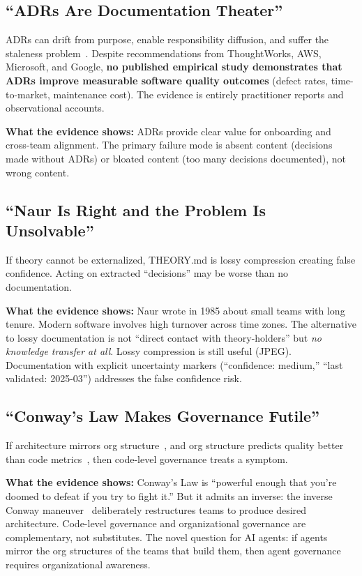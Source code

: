 \documentclass[11pt, a4paper, copyright]{googledeepmind}
\begin{document}
\subsection{``ADRs Are Documentation Theater''}

ADRs can drift from purpose, enable responsibility diffusion, and suffer the staleness problem~\citep{spotify2020}. Despite recommendations from ThoughtWorks, AWS, Microsoft, and Google, \textbf{no published empirical study demonstrates that ADRs improve measurable software quality outcomes} (defect rates, time-to-market, maintenance cost). The evidence is entirely practitioner reports and observational accounts.

\textbf{What the evidence shows:} ADRs provide clear value for onboarding and cross-team alignment. The primary failure mode is absent content (decisions made without ADRs) or bloated content (too many decisions documented), not wrong content.

\subsection{``Naur Is Right and the Problem Is Unsolvable''}

If theory cannot be externalized, THEORY.md is lossy compression creating false confidence. Acting on extracted ``decisions'' may be worse than no documentation.

\textbf{What the evidence shows:} Naur wrote in 1985 about small teams with long tenure. Modern software involves high turnover across time zones. The alternative to lossy documentation is not ``direct contact with theory-holders'' but \emph{no knowledge transfer at all}. Lossy compression is still useful (JPEG). Documentation with explicit uncertainty markers (``confidence: medium,'' ``last validated: 2025-03'') addresses the false confidence risk.

\subsection{``Conway's Law Makes Governance Futile''}

If architecture mirrors org structure~\citep{conway1968}, and org structure predicts quality better than code metrics~\citep{nagappan2008}, then code-level governance treats a symptom.

\textbf{What the evidence shows:} Conway's Law is ``powerful enough that you're doomed to defeat if you try to fight it.'' But it admits an inverse: the inverse Conway maneuver~\citep{skelton2019} deliberately restructures teams to produce desired architecture. Code-level governance and organizational governance are complementary, not substitutes. The novel question for AI agents: if agents mirror the org structures of the teams that build them, then agent governance requires organizational awareness.
\end{document}
